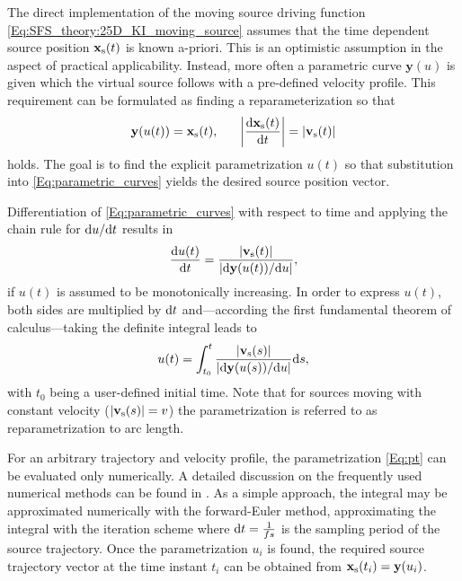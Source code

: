The direct implementation of the moving source driving function \eqref{Eq:SFS_theory:25D_KI_moving_source} assumes that the time dependent source position $\mathbf{x}_{\mathrm{s}}(t)$ is known a-priori. 
This is an optimistic assumption in the aspect of practical applicability. 
Instead, more often a parametric curve $\mathbf{y}(u)$ is given which the virtual source follows with a pre-defined velocity profile.
This requirement can be formulated as finding a reparameterization so that 
\begin{equation}
\mathbf{y}(u(t)) = \mathbf{x}_{\mathrm{s}}(t), \hspace{6mm} \left| \frac{\mathrm{d} \mathbf{x}_{\mathrm{s}}(t)}{\mathrm{d} t} \right| = |\mathbf{v}_{\mathrm{s}}(t)| 
\label{Eq:parametric_curves}
\end{equation}
holds. 
The goal is to find the explicit parametrization $u(t)$ so that substitution into \eqref{Eq:parametric_curves} yields the desired source position vector.

Differentiation of \eqref{Eq:parametric_curves} with respect to time and applying the chain rule for $\mathrm{d} u / \mathrm{d} t$ results in
\begin{equation}
 \frac{\mathrm{d} u(t) }{\mathrm{d} t} = \frac{|\mathbf{v}_{\mathrm{s}}(t)|}{\left| \mathrm{d} \mathbf{y}(u(t)) / \mathrm{d} u \right|},
\end{equation}
if $u(t)$ is assumed to be monotonically increasing.
In order to express $u(t)$, both sides are multiplied by $\mathrm{d} t$ and---according the first fundamental theorem of calculus---taking the definite integral leads to
\begin{equation}
u(t) = \int_{t_0}^{t} \frac{|\mathbf{v}_{\mathrm{s}}(s)|}{\left| \mathrm{d} \mathbf{y}(u(s)) / \mathrm{d} u \right|} \mathrm{d} s,
\label{Eq:pt}
\end{equation}
with $t_0$ being a user-defined initial time.
Note that for sources moving with constant velocity ($|\mathbf{v}_{\mathrm{s}}(s)| = v$) the parametrization is referred to as reparametrization to arc length.

For an arbitrary trajectory and velocity profile, the parametrization \eqref{Eq:pt} can be evaluated only numerically.
A detailed discussion on the frequently used numerical methods can be found in \cite{Parent2012}.
As a simple approach, the integral may be approximated numerically with the forward-Euler method, approximating the integral with the iteration scheme
where $\mathrm{d} t = \frac{1}{fs}$ is the sampling period of the source trajectory.
Once the parametrization $u_i$ is found, the required source trajectory vector at the time instant $t_i$ can be obtained from $\mathbf{x}_{\mathrm{s}}(t_i) = \mathbf{y}(u_i)$. 

